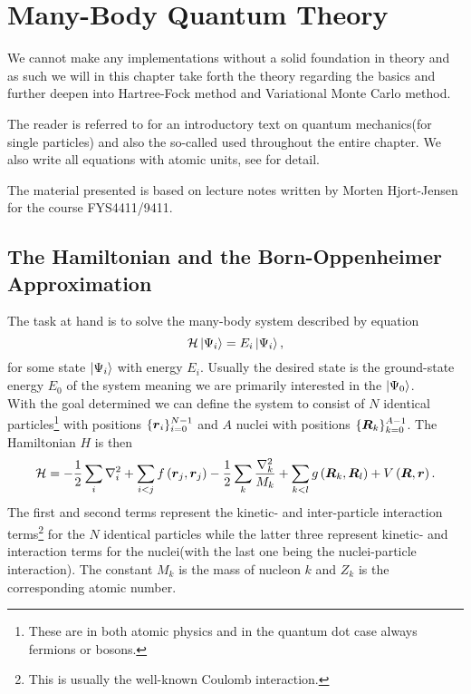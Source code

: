 \chapter{Many-Body Quantum Theory\label{chapter:2}}
    We cannot make any implementations without a solid foundation in theory and
    as such we will in this chapter take forth the theory regarding the basics
     and further deepen into Hartree-Fock
    method and Variational Monte Carlo method. 

    The reader is referred to \cite{GriffQuan} for an introductory text on
    quantum mechanics(for single particles) and also the so-called
     used throughout the entire chapter. We also write
    all equations with atomic units, see  for detail.

    The material presented is based on lecture notes\cite{basicMB, vmc} written
    by Morten Hjort-Jensen for the course FYS4411/9411.

\section{The Hamiltonian and the Born-Oppenheimer Approximation\label{sec:3.1}}
    The task at hand is to solve the many-body system described by
     equation
        \begin{equation}
            \mathcal{H}\ket{\Psi_i} = E_i\ket{\Psi_i},
            \label{eq:SE}
        \end{equation}
    for some state $\ket{\Psi_i}$ with energy $E_i$. Usually the desired state
    is the ground-state energy $E_0$ of the system meaning we are primarily
    interested in the  $\ket{\Psi_0}$. \\ With the goal
    determined we can define the system to consist of $N$ identical
    particles\footnote{These are in both atomic physics and in the quantum dot
    case always fermions or bosons.} with positions
    $\{\boldsymbol{{r}}_i\}^{N-1}_{i=0}$ and $A$ nuclei with positions
    $\{\boldsymbol{{R}}_k\}^{A-1}_{k=0}$. The Hamiltonian $H$ is then
        \begin{equation}
            \mathcal{H} = - \frac{1}{2} \sum\limits_i \nabla^2_i + \sum_{i<j}
            f\left(\boldsymbol{{r}}_j, \boldsymbol{{r}}_j\right) - \frac{1}{2} \sum_k
            \frac{\nabla^2_k}{M_k} + \sum_{k<l}
            g\left(\boldsymbol{{R}}_k,\boldsymbol{{R}}_l\right) +
            V\left(\boldsymbol{{R}},\boldsymbol{{r}}\right).
        \end{equation}
    The first and second terms represent the kinetic- and inter-particle
    interaction terms\footnote{This is usually the well-known Coulomb
    interaction.} for the $N$ identical particles while the latter three
    represent kinetic- and interaction terms for the nuclei(with the last one
    being the nuclei-particle interaction). The constant $M_k$ is the mass of
    nucleon $k$ and $Z_k$ is the corresponding atomic number.

